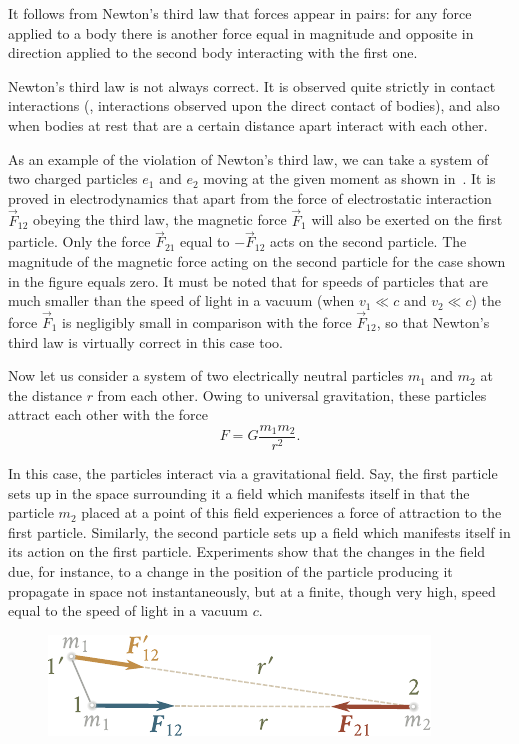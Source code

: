 It follows from Newton's third law that forces appear in pairs: for any force applied to a body there is another force equal in magnitude and opposite in direction applied to the second body interacting with the first one.

Newton's third law is not always correct. It is observed quite strictly in contact interactions (\ie, interactions observed upon the direct contact of bodies), and also when bodies at rest that are a certain distance apart interact with each other.

As an example of the violation of Newton's third law, we can take a system of two charged particles $e_1$ and $e_2$ moving at the given moment as shown in~. It is proved in electrodynamics that apart from the force of electrostatic interaction $\vec{F}_{12}$ obeying the third law, the magnetic force $\vec{F}_1$ will also be exerted on the first particle. Only the force $\vec{F}_{21}$ equal to $-\vec{F}_{12}$ acts on the second particle. The magnitude of the magnetic force acting on the second particle for the case shown in the figure equals zero. It must be noted that for speeds of particles that are much smaller than the speed of light in a vacuum (when $v_1\ll c$ and $v_2\ll c$) the force $\vec{F}_1$ is negligibly small in comparison with the force $\vec{F}_{12}$, so that Newton's third law is virtually correct in this case too.

Now let us consider a system of two electrically neutral particles $m_1$ and $m_2$ at the distance $r$ from each other. Owing to universal gravitation, these particles attract each other with the force
\vspace*{2pt}
\begin{equation}\label{eq:2_18}
F = G\frac{m_1 m_2}{r^2}.
\end{equation}

\noindent
In this case, the particles interact via a gravitational field. Say, the first particle sets up in the space surrounding it a field which manifests itself in that the particle $m_2$ placed at a point of this field experiences a force of attraction to the first particle. Similarly, the second particle sets up a field which manifests itself in its action on the first particle. Experiments show that the changes in the field due, for instance, to a change in the position of the particle producing it propagate in space not instantaneously, but at a finite, though very high, speed equal to the speed of light in a vacuum $c$.

\begin{figure}[t]
	\begin{center}
		\includegraphics[scale=1]{figures/ch_02/fig_2_2.pdf}
		\caption[]{}
		\label{fig:2_2}
	\end{center}
\vspace{-0.7cm}
\end{figure}

